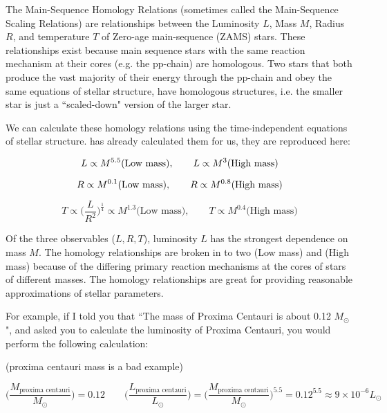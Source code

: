 \documentclass[12pt]{article} %
\numberwithin{equation}{section} %
\begin{document}
The Main-Sequence Homology Relations (sometimes called the Main-Sequence Scaling Relations) are relationships between the Luminosity $L$, Mass $M$, Radius $R$, and temperature $T$ of Zero-age main-sequence (ZAMS) stars. These relationships exist because main sequence stars with the same reaction mechanism at their cores (e.g. the pp-chain) are homologous. Two stars that both produce the vast majority of their energy through the pp-chain and obey the same equations of stellar structure, have homologous structures, i.e. the smaller star is just a ``scaled-down" version of the larger star.

We can calculate these homology relations using the time-independent equations of stellar structure. \citet{spineda2005homology} has already calculated them for us, they are reproduced here:

\begin{equation} \label{homology_L}
L \propto M^{5.5} \text{(Low mass)}, \qquad L \propto M^{3} \text{(High mass)}  \\
\end{equation}

\begin{equation} \label{homology_R}
R \propto M^{0.1} \text{(Low mass)}, \qquad R \propto M^{0.8} \text{(High mass)}  \\
\end{equation}

\begin{equation} \label{homology_T}
T \propto \bigg(\frac{L}{R^{2}}\bigg)^{\frac{1}{4}} \propto M^{1.3} \text{(Low mass)}, \qquad T \propto M^{0.4} \text{(High mass)} 
\end{equation}

Of the three observables ($L, R, T$), luminosity $L$ has the strongest dependence on mass $M$. The homology relationships are broken in to two (Low mass) and (High mass) because of the differing primary reaction mechanisms at the cores of stars of different masses. The homology relationships are great for providing reasonable approximations of stellar parameters. 

For example, if I told you that ``The mass of Proxima Centauri is about 0.12 $M_{\odot}$", and asked you to calculate the luminosity of Proxima Centauri, you would perform the following calculation:

(proxima centauri mass is a bad example)

\begin{equation} \label{homology_ex}
\Big( \frac{M_{\text{proxima centauri}}}{M_{\odot}} \Big) = 0.12 \qquad \Big( \frac{L_{\text{proxima centauri}}}{L_{\odot}} \Big) = \Big( \frac{M_{\text{proxima centauri}}}{M_{\odot}} \Big)^{5.5} = 0.12^{5.5} \approx 9 \times 10^{-6} L_{\odot}
\end{equation}
\end{document}
